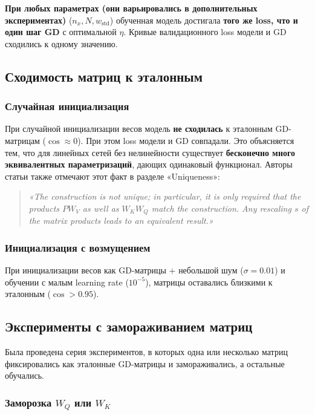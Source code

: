 \documentclass[12pt,a4paper]{article}
\begin{document}
\textbf{При любых параметрах (они варьировались в дополнительных экспериментах)} (\(n_x, N, w_{\text{std}}\)) обученная модель достигала \textbf{того же loss, что и один шаг GD} с оптимальной \(\eta\). Кривые валидационного loss модели и GD сходились к одному значению.

\subsection{Сходимость матриц к эталонным}

\subsubsection{Случайная инициализация}

При случайной инициализации весов модель \textbf{не сходилась} к эталонным GD-матрицам (\(\cos \approx 0\)). При этом loss модели и GD совпадали. Это объясняется тем, что для линейных сетей без нелинейности существует \textbf{бесконечно много эквивалентных параметризаций}, дающих одинаковый функционал. Авторы статьи также отмечают этот факт в разделе «Uniqueness»:
\begin{quote}
\textit{«The construction is not unique; in particular, it is only required that the products \(PW_V\) as well as \(W_KW_Q\) match the construction. Any rescaling \(s\) of the matrix products leads to an equivalent result.»}
\end{quote}

\subsubsection{Инициализация с возмущением}

При инициализации весов как GD-матрицы + небольшой шум (\(\sigma = 0.01\)) и обучении с малым learning rate (\(10^{-5}\)), матрицы оставались близкими к эталонным (\(\cos > 0.95\)).

\subsection{Эксперименты с замораживанием матриц}

Была проведена серия экспериментов, в которых одна или несколько матриц фиксировались как эталонные GD-матрицы и замораживались, а остальные обучались.

\subsubsection{Заморозка \(W_Q\) или \(W_K\)}
\end{document}
